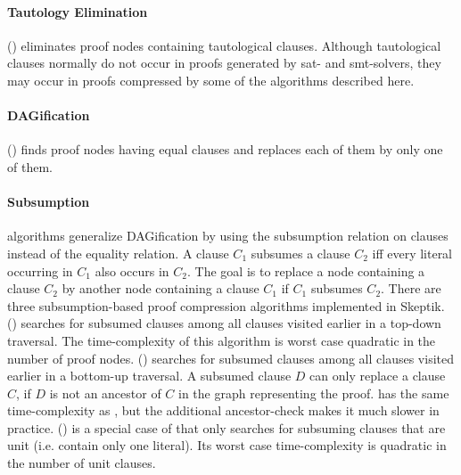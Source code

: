\documentclass{llncs}
\begin{document}
\paragraph{Tautology Elimination} () eliminates proof nodes containing tautological clauses. Although tautological clauses normally do not occur in proofs generated by sat- and smt-solvers, they may occur in proofs compressed by some of the algorithms described here.


\paragraph{DAGification} () finds proof nodes having equal clauses and replaces each of them by only one of them. 


\paragraph{Subsumption} algorithms generalize DAGification by using the subsumption relation on clauses instead of the equality relation. A clause $C_1$ subsumes a clause $C_2$ iff every literal occurring in $C_1$ also occurs in $C_2$. The goal is to replace a node containing a clause $C_2$ by another node containing a clause $C_1$ if $C_1$ subsumes $C_2$.
There are three subsumption-based proof compression algorithms implemented in Skeptik. 
%
 () searches for subsumed clauses among all clauses visited earlier in a top-down traversal. The time-complexity of this algorithm is worst case quadratic in the number of proof nodes.
%
 () searches for subsumed clauses among all clauses visited earlier in a bottom-up traversal. A subsumed clause $D$ can only replace a clause $C$, if $D$ is not an ancestor of $C$ in the graph representing the proof.  has the same time-complexity as , but the additional ancestor-check makes it much slower in practice.
%
 () \cite{RP11} is a special case of  that only searches for subsuming clauses that are unit (i.e. contain only one literal). Its worst case time-complexity is quadratic in the number of unit clauses.
\end{document}
